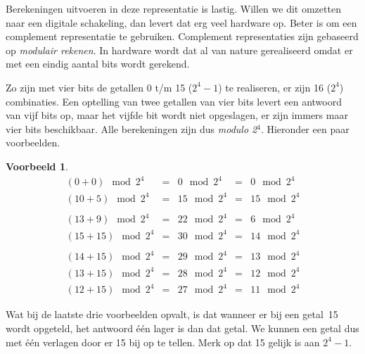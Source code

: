 \documentclass[a4paper,12pt,oneside]{article}
\theoremstyle{own}
\newtheorem{example}{Voorbeeld}[section]
\begin{document}
Berekeningen uitvoeren in deze representatie is lastig.
Willen we dit omzetten naar een digitale schakeling, dan levert dat erg
veel hardware op. Beter is om een complement representatie te gebruiken.
Complement representaties zijn gebaseerd op \textsl{modulair rekenen}. In
hardware wordt dat al van nature gerealiseerd omdat er met een eindig aantal
bits wordt gerekend.

Zo zijn met vier bits de getallen 0 t/m 15 ($2^4-1$) te realiseren, er zijn
16 ($2^4$) combinaties. Een optelling van twee getallen van vier bits levert
een antwoord van vijf bits op, maar het vijfde bit wordt niet opgeslagen, er
zijn immers maar vier bits beschikbaar. Alle berekeningen zijn dus
\textsl{modulo 2}$^4$. Hieronder een paar voorbeelden.

\hrulefill
\begin{example}
\label{exa:somemode24examples}
\begin{equation*}
\begin{array}{rcrcr}
(0 + 0)   \mod 2^4  &=&   0 \mod 2^4  &=&   0 \mod 2^4 \\
(10 + 5)  \mod 2^4  &=&  15 \mod 2^4  &=&  15 \mod 2^4 \\
\\                                       
(13 + 9)  \mod 2^4  &=&  22 \mod 2^4  &=&   6 \mod 2^4 \\
(15 + 15) \mod 2^4  &=&  30 \mod 2^4  &=&  14 \mod 2^4 \\
\\                                       
(14 + 15) \mod 2^4  &=&  29 \mod 2^4  &=&  13 \mod 2^4 \\
(13 + 15) \mod 2^4  &=&  28 \mod 2^4  &=&  12 \mod 2^4 \\
(12 + 15) \mod 2^4  &=&  27 \mod 2^4  &=&  11 \mod 2^4
\end{array}
\end{equation*}
\end{example}
\hrulefill

Wat bij de laatste drie voorbeelden opvalt, is dat wanneer er bij een getal~15
wordt opgeteld, het antwoord \'e\'en lager is dan dat getal. We kunnen een
getal dus met \'e\'en verlagen door er 15 bij op te tellen. Merk op dat 15
gelijk is aan $2^4-1$.

\end{document}
